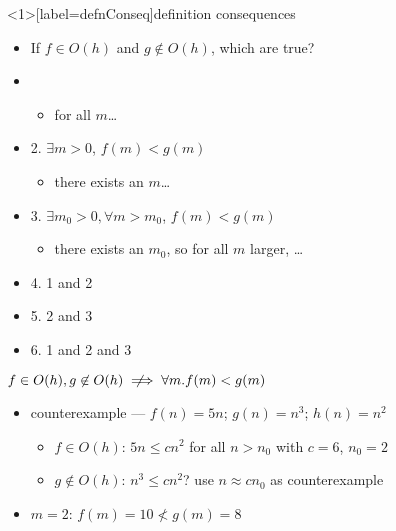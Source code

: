 \begin{frame}<1>[label=defnConseq]{definition consequences}
    \begin{itemize}
        \item If $f \in O(h)$ and $g \not\in O(h)$, which are true?
        \item {}
                \begin{itemize}
                \item for all $m$\ldots
                \end{itemize}
        \item 2. $\exists m>0$, $f(m)<g(m)$
                \begin{itemize}
                \item there exists an $m$\ldots
                \end{itemize}
        \item 3. $\exists m_0>0, \forall m>m_0$, $f(m)<g(m)$
                \begin{itemize}
                \item there exists an $m_0$, so for all $m$ larger, \ldots
                \end{itemize}
        \item 4. 1 and 2
        \item 5. 2 and 3
        \item 6. 1 and 2 and 3
    \end{itemize}
\end{frame}

\newcommand{\notimplies}{%
  \mathrel{{\ooalign{\hidewidth$\not\phantom{=}$\hidewidth\cr$\implies$}}}}

\begin{frame}{\fontsize{16}{17}\selectfont $f\in O(h), g\not\in O(h) \notimplies \forall m. f(m)<g(m)$}
    \begin{itemize}
    \item counterexample --- $f(n) = 5n$; $g(n) = n^3$; $h(n) = n^2$ \\
        \begin{itemize}
            \item $f\in O(h)$: $5n\le c n^2$ for all $n>n_0$ with $c = 6$, $n_0 = 2$
            \item $g\not\in O(h)$: $n^3\le c n^2$? use $n\approx cn_0$ as counterexample
        \end{itemize}
     \item $m=2$: $f(m) = 10 \not< g(m) = 8$
    \end{itemize}
\end{frame}

